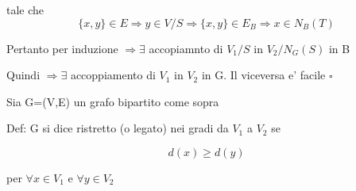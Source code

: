 \documentclass{article}
\begin{document}
\begin{enumerate}
\begin{equation*}
            \end{equation*}
            tale che
            \begin{equation*}
              \{x,y\}\in E \Rightarrow y \in V/S \Rightarrow \{x,y\}\in E_B \Rightarrow x\in N_B(T)
            \end{equation*}
            \begin{flushleft}
              Pertanto per induzione $\Rightarrow \exists$ accopiamnto di $V_1/S$ in $V_2/N_G(S)$ in B
            \end{flushleft}
            \begin{flushleft}
              Quindi $\Rightarrow \exists$ accoppiamento di $V_1$ in $V_2$ in G. Il viceversa e' facile $\square$
            \end{flushleft}
        \end{enumerate}
        \begin{flushleft}
          Sia G=(V,E) un grafo bipartito come sopra
        \end{flushleft}
        \begin{flushleft}
          Def: G si dice ristretto (o legato) nei gradi da $V_1$ a $V_2$ se 
        \end{flushleft}
        \begin{equation*}
          d(x) \geq d(y)
        \end{equation*}
        \begin{flushleft}
          per $\forall x \in V_1$ e $\forall y \in V_2$
        \end{flushleft}
\end{document}
